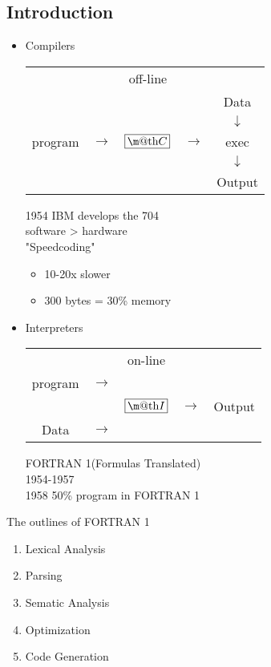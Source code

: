 \documentclass[12pt, a4paper]{article}
\makeatletter
\renewcommand{\boxed}[1]{\text{\fboxsep=.2em\fbox{\m@th$\displaystyle#1$}}}
\newenvironment{lightgrayleftbar}{%
  \def\FrameCommand{\textcolor{lightgray}{\vrule width 3pt} \hspace{3pt}}%
  \MakeFramed {\advance\hsize-\width \FrameRestore}}%
{\endMakeFramed}
\makeatother
\begin{document}
    \subsection{Introduction}
    \begin{itemize}
        \item Compilers
            \begin{center}
                \begin{tabular}{c c c c c}
                    & & off-line & & \\
                    & & & & Data \\
                    & & & & \(\downarrow\) \\
                    program & \(\longrightarrow\) & \(\boxed{C}\) & \(\longrightarrow\) & exec \\
                    & & & & \(\downarrow\) \\
                    & & & & Output \\
                \end{tabular}
            \end{center}
            \begin{lightgrayleftbar}
                1954 IBM develops the 704 \\
                software > hardware \\
                "Speedcoding"
                \begin{itemize}
                    \item 10-20x slower
                    \item 300 bytes = 30\% memory
                \end{itemize}
            \end{lightgrayleftbar}

        \item Interpreters
            \begin{center}
                \begin{tabular}{c c c c c}
                    & & on-line & & \\
                    program & \(\longrightarrow\) & & & \\
                    & & \(\boxed{I}\) & \(\longrightarrow\) & Output \\
                    Data & \(\longrightarrow\) & & & \\
                \end{tabular}
            \end{center}
            \begin{lightgrayleftbar}\noindent
                FORTRAN 1(Formulas Translated) \\
                1954-1957 \\
                1958 50\% program in FORTRAN 1
                
            \end{lightgrayleftbar}
    \end{itemize}

    The outlines of FORTRAN 1
    \begin{enumerate}
        \item Lexical Analysis
        \item Parsing
        \item Sematic Analysis
        \item Optimization
        \item Code Generation
    \end{enumerate}
\end{document}

